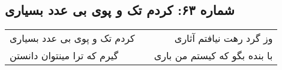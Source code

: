 \begin{center}
\section*{شماره ۶۳: کردم تک و پوی بی عدد بسیاری}
\label{sec:063}
\begin{longtable}{l p{0.5cm} r}
کردم تک و پوی بی عدد بسیاری
&&
وز گرد رهت نیافتم آثاری
\\
گیرم که ترا مینتوان دانستن
&&
با بنده بگو که کیستم من باری
\\
\end{longtable}
\end{center}
